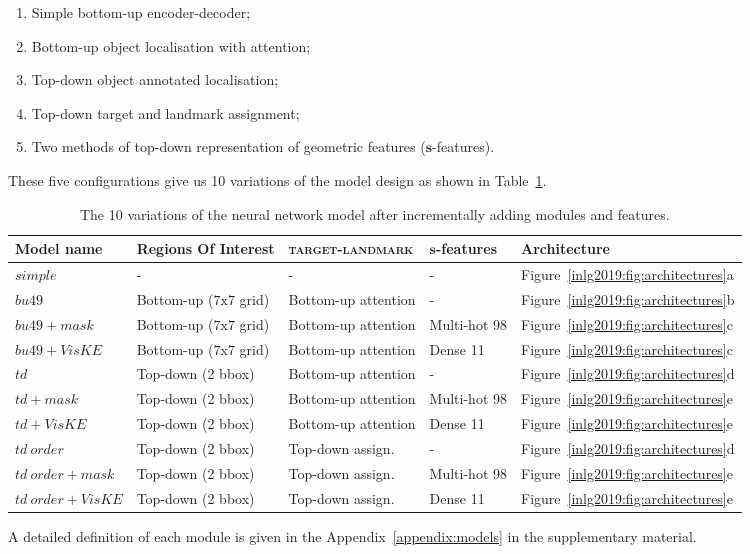 \begin{enumerate}[nosep]
	\item Simple bottom-up encoder-decoder; %
	\item Bottom-up object localisation with attention;
	\item Top-down object annotated localisation;
	\item Top-down target and landmark assignment;
	\item Two methods of top-down representation of geometric features ($\bm{s}$-features).
\end{enumerate}
These five %
configurations %
give us 10 variations of the model design as shown in Table~\ref{inlg2019:tab:models}. %
\begin{table}[htb]
	\centering
	\scriptsize
	\begin{tabular}{|l|l|l|l|l|}
		\hline
		 Model name & Regions Of Interest & \textsc{target}-\textsc{landmark} & $\bm{s}$-features & Architecture \\
		\hline
		$simple$     & - & - & - & Figure~\ref{inlg2019:fig:architectures}a \\
		\hline
		$bu49$       & Bottom-up ($7\mathrm{x}7$ grid) & Bottom-up attention & - & Figure~\ref{inlg2019:fig:architectures}b \\
		$bu49+mask$  & Bottom-up ($7\mathrm{x}7$ grid) & Bottom-up attention & Multi-hot 98 & Figure~\ref{inlg2019:fig:architectures}c \\
		$bu49+VisKE$ & Bottom-up ($7\mathrm{x}7$ grid) & Bottom-up attention & Dense 11 & Figure~\ref{inlg2019:fig:architectures}c \\
		\hline
		$td$         & Top-down (2 bbox) & Bottom-up attention & -    & Figure~\ref{inlg2019:fig:architectures}d \\
		$td+mask$    & Top-down (2 bbox) & Bottom-up attention & Multi-hot 98  & Figure~\ref{inlg2019:fig:architectures}e \\
		$td+VisKE$   & Top-down (2 bbox) & Bottom-up attention & Dense 11 & Figure~\ref{inlg2019:fig:architectures}e \\
		\hline
		$td~order$         & Top-down (2 bbox) & Top-down assign. & - & Figure~\ref{inlg2019:fig:architectures}d \\
		$td~order+mask$    & Top-down (2 bbox) & Top-down assign. & Multi-hot 98 & Figure~\ref{inlg2019:fig:architectures}e \\
		$td~order+VisKE$   & Top-down (2 bbox) & Top-down assign. & Dense 11 & Figure~\ref{inlg2019:fig:architectures}e \\
		\hline
	\end{tabular}
	\vspace{0.5em}
	\caption{The 10 variations of the neural network  model after incrementally adding modules and features.%
	}
	\label{inlg2019:tab:models}
\end{table}
A detailed definition of each module is given in the Appendix~\ref{appendix:models} in the supplementary material.

